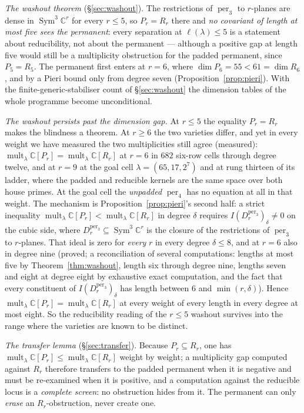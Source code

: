 \documentclass[11pt]{amsart}
\theoremstyle{plain}
\theoremstyle{definition}
\theoremstyle{remark}
\DeclareMathOperator{\Sym}{Sym}
\DeclareMathOperator{\mult}{mult}
\DeclareMathOperator{\per}{per}
\newcommand{\bC}{\mathbb{C}}
\newcommand{\Rr}{R}
\newcommand{\Pp}{P}
\begin{document}
\emph{The washout theorem} (\S\ref{sec:washout}).  The restrictions of $\per_3$
to $r$-planes are dense in $\Sym^{3}\bC^{r}$ for every $r\le5$, so
$\Pp_r=\Rr_r$ there and \emph{no covariant of length at most five sees the
permanent}: every separation at $\ell(\lambda)\le5$ is a statement about
reducibility, not about the permanent --- although a positive gap at length five
would still be a multiplicity obstruction for the padded permanent, since
$\Pp_5=\Rr_5$.  The permanent first enters at $r=6$,
where $\dim\Pp_6=55<61=\dim\Rr_6$, and by a Pieri bound only from degree seven
(Proposition~\ref{prop:pieri}).  With the finite-generic-stabiliser count of
\S\ref{sec:washout} the dimension tables of the whole programme become
unconditional.

\emph{The washout persists past the dimension gap.}  At $r\le5$ the equality
$\Pp_r=\Rr_r$ makes the blindness a theorem.  At $r\ge6$ the two varieties
differ, and yet in every weight we have measured the two multiplicities still
agree (measured): $\mult_\lambda\bC[\Pp_r]=\mult_\lambda\bC[\Rr_r]$ at $r=6$ in $682$
six-row cells through degree twelve, and at $r=9$ at the goal cell
$\lambda=(65,17,2^{7})$ and at rung thirteen of its ladder, where the padded and
reducible kernels are the same space over both house primes.  At the goal cell
the \emph{unpadded} $\per_4$ has no equation at all in that weight.  The
mechanism is Proposition~\ref{prop:pieri}'s second half: a strict inequality
$\mult_\lambda\bC[\Pp_r]<\mult_\lambda\bC[\Rr_r]$ in degree $\delta$
requires $I(D^{\per_3}_r)_\delta\neq0$ on the cubic side, where
$D^{\per_3}_r\subseteq\Sym^{3}\bC^{r}$ is the closure of the restrictions of
$\per_3$ to $r$-planes.  That ideal is zero for \emph{every} $r$ in every degree
$\delta\le8$, and at $r=6$ also in degree nine (proved; a reconciliation of
several computations: lengths at most five by Theorem~\ref{thm:washout}, length
six through degree nine, lengths seven and eight at degree eight by exhaustive
exact computation, and the fact that every constituent of $I(D^{\per_3}_r)_\delta$
has length between $6$ and $\min(r,\delta)$).  Hence
$\mult_\lambda\bC[\Pp_r]=\mult_\lambda\bC[\Rr_r]$ at every weight of every
length in every degree at most eight.  So the reducibility reading of the
$r\le5$ washout survives into the range where the varieties are known to be
distinct.

\emph{The transfer lemma} (\S\ref{sec:transfer}).  Because $\Pp_r\subseteq\Rr_r$,
one has $\mult_\lambda\bC[\Pp_r]\le\mult_\lambda\bC[\Rr_r]$ weight by weight; a
multiplicity gap computed against $\Rr_r$ therefore transfers to the padded
permanent when it is negative and must be re-examined when it is positive, and
a computation against the reducible locus is a \emph{complete screen}: no
obstruction hides from it.  The permanent can only \emph{erase} an
$\Rr_r$-obstruction, never create one.
\end{document}
